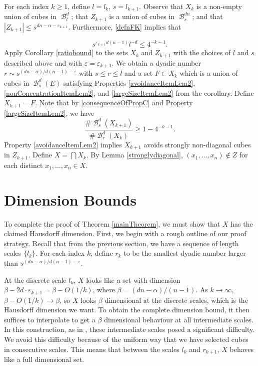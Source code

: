 \documentclass[dvipsnames,letterpaper,12pt]{article}
\numberwithin{equation}{section}
\theoremstyle{plain}
\DeclareMathOperator{\B}{\mathcal{B}}
\begin{document}
For each index $k \geq 1$, define $l = l_k$, $s = l_{k+1}$. Observe that $X_k$ is a non-empty union of cubes in $\B^d_l$; that $Z_{k+1}$ is a union of cubes in $\B^{dn}_s$; and that $|Z_{k+1}|\leq s^{dn-\alpha-\varepsilon_{k+1}}$. Furthermore, \eqref{defnFK} implies that

\begin{equation}\label{consequenceOfPropC}
s^{\varepsilon_{k+1} d(n-1)}l^{-d} \leq 4^{-k-1}.
\end{equation}
%
Apply Corollary \ref{ratiobound} to the sets $X_k$ and $Z_{k+1}$ with the choices of $l$ and $s$ described above and with $\varepsilon=\varepsilon_{k+1}$. We obtain a dyadic number $r \sim s^{(dn - \alpha)/d(n-1) - \varepsilon}$ with $s\leq r\leq l$ and a set $F\subset X_k$ which is a union of cubes in $\B^d_s(E)$ satisfying Properties \ref{avoidanceItemLem2}, \ref{nonConcentrationItemLem2}, and \ref{largeSizeItemLem2} from the corollary. Define $X_{k+1}=F$. Note that by \eqref{consequenceOfPropC} and Property \ref{largeSizeItemLem2}, we have 
\begin{equation}\label{sizeOfXkp1vsXk}
\frac{\# \B_s^d(X_{k+1})}{\# \B_r^d(X_k)}\geq 1 - 4^{-k-1}.
\end{equation}
%
Property \ref{avoidanceItemLem2} implies $X_{k+1}$ avoids strongly non-diagonal cubes in $Z_{k+1}$. Define $X = \bigcap X_k$. By Lemma \ref{stronglydiagonal}, $(x_1, \dots, x_n) \not \in Z$ for each distinct $x_1, \dots, x_n \in X$.









\section{Dimension Bounds}\label{dimensionsection}

To complete the proof of Theorem \ref{mainTheorem}, we must show that $X$ has the claimed Hausdorff dimension. First, we begin with a rough outline of our proof strategy. Recall that from the previous section, we have a sequence of length scales $\{l_k\}$. For each index $k$, define $r_k$ to be the smallest dyadic number larger than $s^{(dn - \alpha)/d(n-1) - \varepsilon}$. 

At the discrete scale $l_k$, $X$ looks like a set with dimension $\beta - 2d \cdot \varepsilon_{k+1} = \beta - O(1/k)$, where $\beta = (dn - \alpha)/(n-1)$. As $k \to \infty$, $\beta - O(1/k) \to \beta$, so $X$ looks $\beta$ dimensional at the discrete scales, which is the Hausdorff dimension we want. To obtain the complete dimension bound, it then suffices to interpolate to get a $\beta$ dimensional behaviour at all intermediate scales. In this construction, as in \cite{MalabikaRob}, these intermediate scales posed a significant difficulty. We avoid this difficulty because of the uniform way that we have selected cubes in consecutive scales. This means that between the scales $l_k$ and $r_{k+1}$, $X$ behaves like a full dimensional set.
\end{document}

